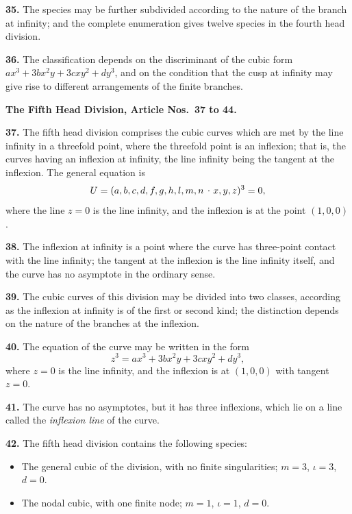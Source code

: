 \documentclass[11pt,a4paper]{article}
\theoremstyle{plain}
\theoremstyle{definition}
\newcommand{\lc}{\kern.17em\raise.5ex\hbox{.}\kern.08em}  %
\begin{document}
\textbf{35.} The species may be further subdivided according to the nature of the branch at infinity; and the complete enumeration gives twelve species in the fourth head division.

\textbf{36.} The classification depends on the discriminant of the cubic form $ax^3 + 3bx^2y + 3cxy^2 + dy^3$, and on the condition that the cusp at infinity may give rise to different arrangements of the finite branches.

\bigskip

\noindent\textbf{The Fifth Head Division, Article Nos.~37 to 44.}

\medskip

\textbf{37.} The fifth head division comprises the cubic curves which are met by the line infinity in a threefold point, where the threefold point is an inflexion; that is, the curves having an inflexion at infinity, the line infinity being the tangent at the inflexion. The general equation is
\[
U = (a, b, c, d, f, g, h, l, m, n \mathbin{\lc} x, y, z)^3 = 0,
\]
where the line $z = 0$ is the line infinity, and the inflexion is at the point $(1, 0, 0)$.

\textbf{38.} The inflexion at infinity is a point where the curve has three-point contact with the line infinity; the tangent at the inflexion is the line infinity itself, and the curve has no asymptote in the ordinary sense.

\textbf{39.} The cubic curves of this division may be divided into two classes, according as the inflexion at infinity is of the first or second kind; the distinction depends on the nature of the branches at the inflexion.

\textbf{40.} The equation of the curve may be written in the form
\[
z^3 = ax^3 + 3bx^2y + 3cxy^2 + dy^3,
\]
where $z = 0$ is the line infinity, and the inflexion is at $(1, 0, 0)$ with tangent $z = 0$.

\textbf{41.} The curve has no asymptotes, but it has three inflexions, which lie on a line called the \textit{inflexion line} of the curve.

\textbf{42.} The fifth head division contains the following species:
\begin{itemize}
\item[(1)] The general cubic of the division, with no finite singularities; $m = 3$, $\iota = 3$, $d = 0$.
\item[(2)] The nodal cubic, with one finite node; $m = 1$, $\iota = 1$, $d = 0$.
\end{itemize}
\end{document}
